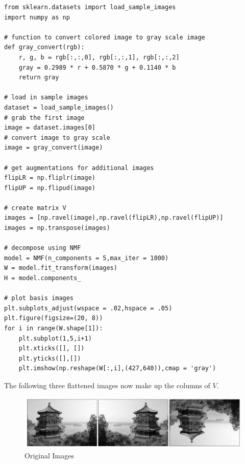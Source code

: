 \begin{lstlisting}
from sklearn.datasets import load_sample_images
import numpy as np

# function to convert colored image to gray scale image
def gray_convert(rgb):
    r, g, b = rgb[:,:,0], rgb[:,:,1], rgb[:,:,2]
    gray = 0.2989 * r + 0.5870 * g + 0.1140 * b
    return gray
    
# load in sample images
dataset = load_sample_images()
# grab the first image
image = dataset.images[0] 
# convert image to gray scale
image = gray_convert(image)

# get augmentations for additional images
flipLR = np.fliplr(image)
flipUP = np.flipud(image)

# create matrix V
images = [np.ravel(image),np.ravel(flipLR),np.ravel(flipUP)]
images = np.transpose(images)

# decompose using NMF
model = NMF(n_components = 5,max_iter = 1000)
W = model.fit_transform(images)
H = model.components_

# plot basis images
plt.subplots_adjust(wspace = .02,hspace = .05)
plt.figure(figsize=(20, 8)) 
for i in range(W.shape[1]):
    plt.subplot(1,5,i+1)
    plt.xticks([], [])
    plt.yticks([],[])
    plt.imshow(np.reshape(W[:,i],(427,640)),cmap = 'gray')

\end{lstlisting}


The following three flattened images now make up the columns of $V$.

\begin{figure}[H]
\centering
\includegraphics[width=\textwidth]{figures/building_images.pdf}
\caption{Original Images}
\label{fig:basis_faces1}
\end{figure}

